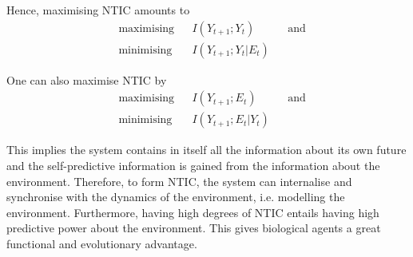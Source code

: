 \documentclass[utf8]{article}
\begin{document}
			\noindent
			Hence, maximising NTIC amounts to
				\begin{equation}
    				\label{eq:nticObjective}
    				\begin{aligned}
    				& \text{maximising} & { } & I(Y_{t+1};Y_{t}) & { } & \text{and} \\
    				& \text{minimising} & { } & I(Y_{t+1};Y_{t}|E_{t}) & { }
    				\end{aligned}
				\end{equation}
				
			One can also maximise NTIC by 
				\begin{equation}
    				\label{eq:nticObjective2}
    				\begin{aligned}
    				& \text{maximising} & { } & I(Y_{t+1};E_{t}) & { } & \text{and} \\
    				& \text{minimising} & { } & I(Y_{t+1};E_{t}|Y_{t}) & { }
    				\end{aligned}
				\end{equation}			

			\noindent
			This implies the system contains in itself all the information about its own future and the self-predictive information is gained from the information about the environment. Therefore, to form NTIC, the system can internalise and synchronise with the dynamics of the environment, i.e. modelling the environment. Furthermore, having high degrees of NTIC entails having high predictive power about the environment. This gives biological agents a great functional and evolutionary advantage. 
			


            
\end{document}
